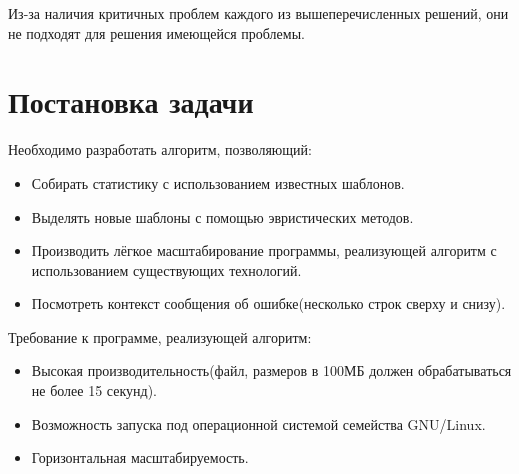 Из-за наличия критичных проблем каждого из вышеперечисленных решений,
они не подходят для решения имеющейся проблемы.

\section{Постановка задачи}

Необходимо разработать алгоритм, позволяющий:
\begin{itemize}
  \item Собирать статистику с использованием известных шаблонов.
  \item Выделять новые шаблоны с помощью эвристических методов.
  \item Производить лёгкое масштабирование программы, реализующей алгоритм
    с использованием существующих технологий.
  \item Посмотреть контекст сообщения об ошибке(несколько строк сверху
    и снизу).
\end{itemize}

Требование к программе, реализующей алгоритм:
\begin{itemize}
  \item Высокая производительность(файл, размеров в 100МБ должен
     обрабатываться не более 15 секунд).
  \item Возможность запуска под операционной системой семейства GNU/Linux.
  \item Горизонтальная масштабируемость.
\end{itemize}



